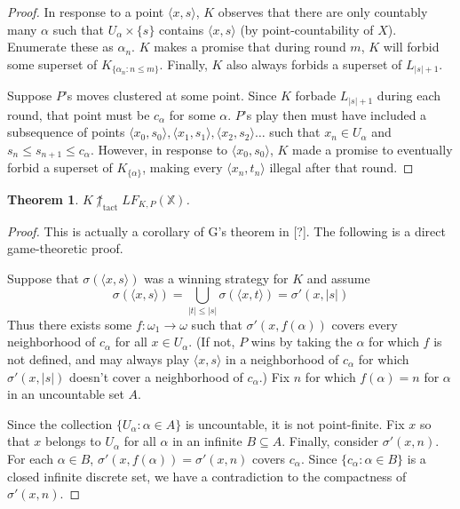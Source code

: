 \documentclass[11pt]{article}
\theoremstyle{plain}
\newtheorem{theorem}{Theorem}
\theoremstyle{definition}
\theoremstyle{remark}
\newcommand{\tactwin}{\uparrow_{\text{tact}}}
\newcommand{\lfkpgame}[1]{LF_{K,P}(#1)}
\newcommand{\<}{\langle}
\renewcommand{\>}{\rangle}
\begin{document}
\begin{proof}
In response to a point $\<x,s\>$, $K$ observes that there are only countably many $\alpha$ such that $U_\alpha \times \{s\}$ contains $\<x,s\>$ (by point-countability of $X$). Enumerate these as $\alpha_n$. $K$ makes a promise that during round $m$, $K$ will forbid some superset of $K_{\{\alpha_n : n\leq m\}}$. Finally, $K$ also always forbids a superset of $L_{|s|+1}$.

Suppose $P$'s moves clustered at some point. Since $K$ forbade $L_{|s|+1}$ during each round, that point must be $c_\alpha$ for some $\alpha$. $P$'s play then must have included a subsequence of points $\<x_0,s_0\>,\<x_1,s_1\>,\<x_2,s_2\>\dots$ such that $x_n \in U_\alpha$ and $s_n \leq s_{n+1} \leq c_\alpha$. However, in response to $\<x_0,s_0\>$, $K$ made a promise to eventually forbid a superset of $K_{\{\alpha\}}$, making every $\<x_n,t_n\>$ illegal after that round.
\end{proof}




\begin{theorem}
$K\not\tactwin\lfkpgame{\mathbb{X}}$.
\end{theorem}

\begin{proof}
This is actually a corollary of G's theorem in [?]. The following is a direct game-theoretic proof.

Suppose that $\sigma(\<x,s\>)$ was a winning strategy for $K$ and assume 
  \[
    \sigma(\<x,s\>) = \bigcup_{|t|\leq |s|} \sigma(\<x,t\>) = \sigma'(x,|s|)
  \]
Thus there exists some $f: \omega_1 \to \omega$ such that $\sigma'(x,f(\alpha))$ covers every neighborhood of $c_\alpha$ for all $x\in U_\alpha$. (If not, $P$ wins by taking the $\alpha$ for which $f$ is not defined, and may always play $\<x,s\>$ in a neighborhood of $c_\alpha$ for which $\sigma'(x,|s|)$ doesn't cover a neighborhood of $c_\alpha$.) Fix $n$ for which $f(\alpha)=n$ for $\alpha$ in an uncountable set $A$.

Since the collection $\{U_\alpha : \alpha \in A\}$ is uncountable, it is not point-finite. Fix $x$ so that $x$ belongs to $U_\alpha$ for all $\alpha$ in an infinite $B \subseteq A$. Finally, consider $\sigma'(x,n)$. For each $\alpha\in B$, $\sigma'(x,f(\alpha))=\sigma'(x,n)$ covers $c_\alpha$. Since $\{c_\alpha : \alpha \in B\}$ is a closed infinite discrete set, we have a contradiction to the compactness of $\sigma'(x,n)$.
\end{proof}
\end{document}
